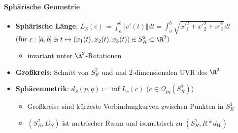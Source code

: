 \paragraph{Sphärische Geometrie}
\begin{itemize}
  \item \textbf{Sphärische Länge}: \( L_S(c) \coloneqq \int_a^b \Vert c'(t) \Vert dt = \int_a^b \sqrt{{x'}_1^2+{x'}_2^2+{x'}_3^2}dt \) \\
  (für \( c: [a,b] \ni t \mapsto (x_1(t), x_2(t), x_3(t)) \in S_R^2 \subset \R^3 \))
  \begin{itemize}
    \item invariant unter \( \R^2 \)-Rotationen
  \end{itemize}
  \item \textbf{Großkreis}: Schnitt von \( S^2_R \) und und \( 2 \)-dimensionalen UVR des \( \R^2 \)
  \item \textbf{Sphärenmetrik}: \( d_S(p,q) \coloneqq \inf L_s(c) \) (\( c \in \Omega_{pq}(S_R^2) \))
  \begin{itemize}
    \item Großkreise sind kürzeste Verbindungkurven zwischen Punkten in \( S_R^2 \)
    \item \( (S_R^2, D_S) \) ist metrischer Raum und isometrisch zu \( (S_R^2, R*d_W) \)
  \end{itemize}
\end{itemize}